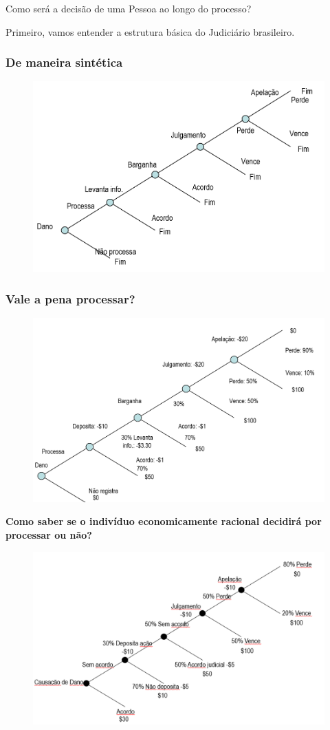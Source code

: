 \documentclass[a4paper,12pt]{article}[abntex2]
\begin{document}
Como será a decisão de uma Pessoa ao longo do processo?

Primeiro, vamos entender a estrutura básica do Judiciário brasileiro.

\subsubsection{\textbf{De maneira sintética}}
\begin{figure}[H]
    \centering
    \includegraphics[width=0.7\linewidth]{Imagens/a13i2.png}
\end{figure}

\subsubsection{\textbf{Vale a pena processar?}}
\begin{figure}[H]
    \centering
    \includegraphics[width=0.7\linewidth]{Imagens/a13i3.png}
\end{figure}

\textbf{Como saber se o indivíduo economicamente  racional decidirá por processar ou não?}

\begin{figure}[H]
    \centering
    \includegraphics[width=0.5\linewidth]{Imagens/a13i4.png}
\end{figure}
\end{document}
